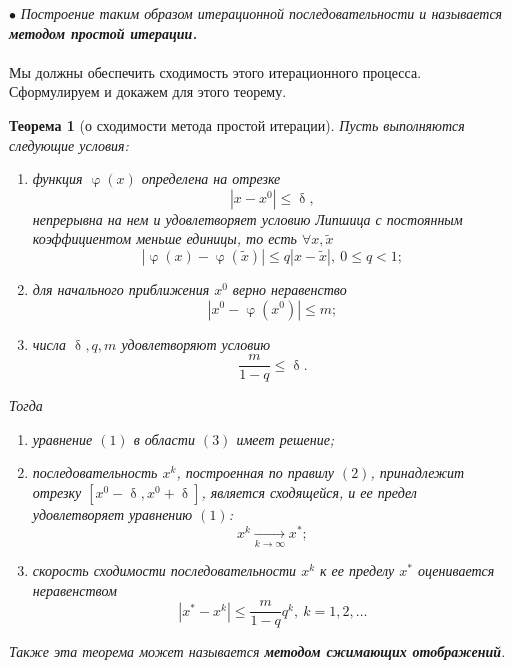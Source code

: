 \documentclass[a4paper, 12pt]{report}
\numberwithin{equation}{section}
\renewcommand{\leq}{\leqslant}
\renewcommand{\delta}{\updelta}
\renewcommand{\varphi}{\upvarphi}
\newtheorem*{theorem}{Теорема}
\begin{document}
	$\bullet$ \textit{Построение таким образом итерационной последовательности и называется \textbf{методом простой итерации.}}
	\\\\
	Мы должны обеспечить сходимость этого итерационного процесса. Сформулируем и докажем для этого теорему.
	\begin{theorem}
		[о сходимости метода простой итерации]
		Пусть выполняются следующие условия:\begin{enumerate}
			\item функция $\varphi(x)$ определена на отрезке \begin{equation}
				|x - x^0| \leq \delta,
			\end{equation} непрерывна на нем и удовлетворяет условию Липшица с постоянным коэффициентом меньше единицы, то есть $\forall x, \widetilde{x}$ 
			\begin{equation}
			|\varphi(x) - \varphi(\widetilde{x})| \leq q |x - \widetilde{x}| ,\ 0 \leq q < 1;
			\end{equation}
			\item для начального приближения $x^0$ верно неравенство $$|x^0 - \varphi(x^0)| \leq m;$$
			\item числа $\delta, q, m$ удовлетворяют условию \begin{equation}
				\dfrac{m}{1-q}\leq \delta.
			\end{equation}
		\end{enumerate}
		Тогда \begin{enumerate}
			\item уравнение $(1)$ в области $(3)$ имеет решение;
			\item последовательность $x^k$, построенная по правилу $(2)$, принадлежит отрезку $[x^0 - \delta, x^0 + \delta]$, является сходящейся, и ее предел удовлетворяет уравнению $(1)$: $$x^k \xrightarrow[k\to \infty]{} x^*;$$
			\item скорость сходимости последовательности $x^k$ к ее пределу $x^*$ оценивается неравенством 
			\begin{equation}
				|x^* - x^k| \leq \dfrac{m}{1- q}q^k,\ k = 1,2,\ldots
			\end{equation}
		\end{enumerate}
		Также эта теорема может называется \textbf{методом сжимающих отображений}.
	\end{theorem}
\end{document}
